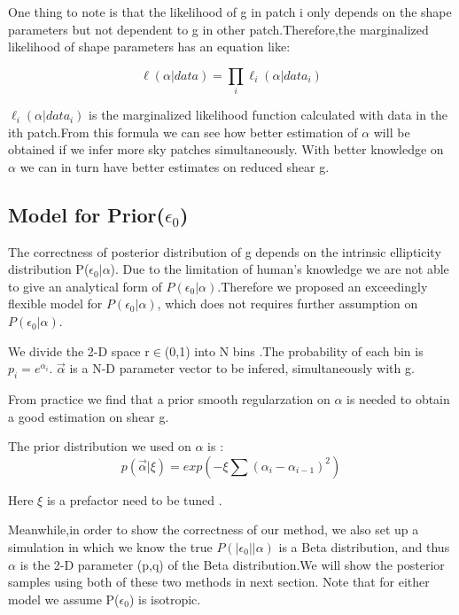 \documentclass[useAMS,usenatbib]{mn2e}
\begin{document}
One thing to note is that the likelihood of g in patch i only depends
on the shape parameters but not dependent to g in other patch.Therefore,the
marginalized likelihood of shape parameters has an equation like:

\begin{equation}
\ell(\alpha|data)=\prod_{i}\ell_{i}(\alpha|data_{i})
\end{equation}


$\ell_{i}(\alpha|data_{i})$ is the marginalized likelihood function
calculated with data in the ith patch.From this formula we can see
how better estimation of $\alpha$ will be obtained if we infer more
sky patches simultaneously. With better knowledge on $\alpha$ we
can in turn have better estimates on reduced shear g.


\subsection{Model for Prior($\epsilon_{0}$)}

The correctness of posterior distribution of g depends on the intrinsic
ellipticity distribution P($\epsilon_{0}|\alpha$). Due to the limitation
of human's knowledge we are not able to give an analytical form of
$P(\epsilon_{0}|\alpha)$.Therefore we proposed an exceedingly flexible
model for $P(\epsilon_{0}|\alpha)$, which does not requires further
assumption on $P(\epsilon_{0}|\alpha)$.

We divide the 2-D space r$\in$(0,1) into N bins .The probability
of each bin is $p_{i}=e^{\alpha_{i}}$. $\overrightarrow{\alpha}$
is a N-D parameter vector to be infered, simultaneously with g.

From practice we find that a prior smooth regularzation on $\alpha$
is needed to obtain a good estimation on shear g.

The prior distribution we used on $\alpha$ is : 
\begin{equation}
p(\vec{\alpha}|\xi)=exp(-\xi\sum(\alpha_{i}-\alpha_{i-1})^{2})
\end{equation}


Here $\xi$ is a prefactor need to be tuned .

Meanwhile,in order to show the correctness of our method, we also
set up a simulation in which we know the true $P(|\epsilon_{0}||\alpha)$
is a Beta distribution, and thus $\alpha$ is the 2-D parameter (p,q)
of the Beta distribution.We will show the posterior samples using
both of these two methods in next section. Note that for either model
we assume P($\epsilon_{0}$) is isotropic.
\end{document}
